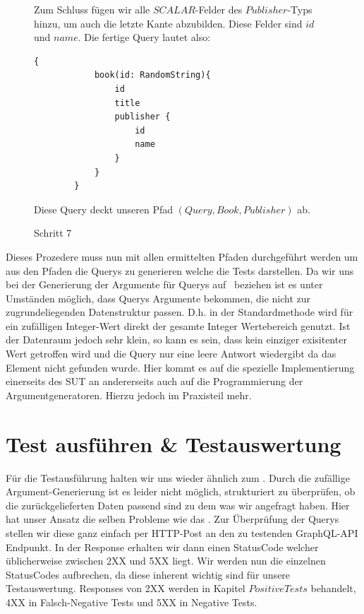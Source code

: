 \begin{figure}[htbp]
    Zum Schluss fügen wir alle $SCALAR$-Felder des $Publisher$-Typs hinzu, um auch die letzte Kante abzubilden.
    Diese Felder sind $id$ und $name$.
    Die fertige Query lautet also:

    \begin{lstlisting}[language=GraphQL]
        {
            book(id: RandomString){
                id
                title
                publisher {
                    id
                    name
                }
            }
        }
    \end{lstlisting}

    Diese Query deckt unseren Pfad $(Query, Book, Publisher)$ ab.
    \caption{Schritt 7}
\end{figure}

Dieses Prozedere muss nun mit allen ermittelten Pfaden durchgeführt werden um aus den Pfaden die Querys zu generieren welche
die Tests darstellen.
Da wir uns bei der Generierung der Argumente für Querys auf~\cite[Property-based Testing]{property-based-testing} beziehen ist es
unter Umständen möglich, dass Querys Argumente bekommen, die nicht zur zugrundeliegenden Datenstruktur passen.
D.h. in der Standardmethode wird für ein zufälligen Integer-Wert direkt der gesamte Integer Wertebereich genutzt.
Ist der Datenraum jedoch sehr klein, so kann es sein, dass kein einziger exisitenter Wert getroffen wird und die
Query nur eine leere Antwort wiedergibt da das Element nicht gefunden wurde.
Hier kommt es auf die spezielle Implementierung einerseits des SUT an andererseits auch auf die Programmierung der
Argumentgeneratoren.
Hierzu jedoch im Praxisteil mehr.

\section{Test ausführen \& Testauswertung}

Für die Testausführung halten wir uns wieder ähnlich zum \cite[Property-based Testing]{property-based-testing}.
Durch die zufällige Argument-Generierung ist es leider nicht möglich, strukturiert zu überprüfen, ob die zurückgelieferten Daten
passend sind zu dem was wir angefragt haben.
Hier hat unser Ansatz die selben Probleme wie das \cite[Property-based Testing]{property-based-testing}.
Zur Überprüfung der Querys stellen wir diese ganz einfach per HTTP-Post an den zu testenden GraphQL-API Endpunkt.
In der Response erhalten wir dann einen StatusCode welcher üblicherweise zwischen 2XX und 5XX liegt.
Wir werden nun die einzelnen StatusCodes aufbrechen, da diese inherent wichtig sind für unsere Testauswertung.
Responses von 2XX werden in Kapitel $Positive Tests$ behandelt, 4XX in Falsch-Negative Tests und 5XX in Negative Tests.

